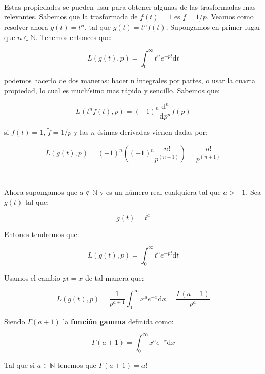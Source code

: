 \documentclass[12pt]{book}
\newcommand{\D}{\mathrm{d}}
\newcommand{\into}{\int_{0}^{\infty}}
\newcommand{\tf}{\tilde{f}}
\begin{document}
\begin{flushleft}

\hrulefill \\

Estas propiedades se pueden usar para obtener algunas de las trasformadas mas relevantes. Sabemos que la trasformada de $f(t) = 1$ es $\tf = 1/p$. Veamos como resolver ahora $g(t) = t^n$, tal que $g(t)=t^n f(t)$. Supongamos en primer lugar que $n \in \mathbb{N}$. Tenemos entonces que:

$$ L(g(t),p) = \into t^n e^{-pt} \D t $$

podemos hacerlo de dos maneras: hacer n integrales por partes, o usar la cuarta propiedad, lo cual es muchísimo mas rápido y sencillo. Sabemos que:

$$ L(t^n f(t), p) = (-1)^n \dfrac{\D^n}{\D p^n} \tilde{f} (p) $$

si $f(t)=1$, $\tf = 1/p$ y las $n$-ésimas derivadas vienen dadas por:

$$ L(g(t),p) = (-1)^n \left( (-1)^n \dfrac{n!}{p^{(n+1)}} \right) = \dfrac{n!}{p^{(n+1)}}$$

\hrulefill \\

\hrulefill

Ahora supongamos que $a \notin \mathbb{N}$ y es un número real cualquiera tal que $a > -1$. Sea $g(t)$ tal que:

$$ g(t) = t^a $$

Entones tendremos que:

$$L(g(t),p) = \into t^a e^{-pt} \D t $$

Usamos el cambio $pt = x$ de tal manera que:

$$ L(g(t),p) = \dfrac{1}{p^{a+1}} \into x^a e^{-x} \D x = \dfrac{\Gamma(a+1)}{p^a} $$

Siendo $\Gamma (a+1)$ la \textbf{función gamma} definida como:

\begin{equation}
\Gamma (a+1) = \into x^a e^{-x} \D x
\end{equation}

Tal que si $a \in \mathbb{N}$ tenemos que $\Gamma (a+1) = a!$

\hrulefill 

\end{flushleft}
\end{document}
